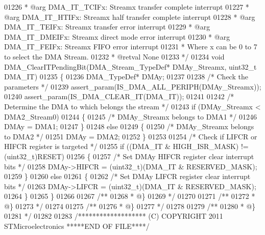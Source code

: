 \begin{DoxyCode}
01226 \textcolor{comment}{  *            @arg DMA\_IT\_TCIFx:  Streamx transfer complete interrupt}
01227 \textcolor{comment}{  *            @arg DMA\_IT\_HTIFx:  Streamx half transfer complete interrupt}
01228 \textcolor{comment}{  *            @arg DMA\_IT\_TEIFx:  Streamx transfer error interrupt}
01229 \textcolor{comment}{  *            @arg DMA\_IT\_DMEIFx: Streamx direct mode error interrupt}
01230 \textcolor{comment}{  *            @arg DMA\_IT\_FEIFx:  Streamx FIFO error interrupt}
01231 \textcolor{comment}{  *         Where x can be 0 to 7 to select the DMA Stream.}
01232 \textcolor{comment}{  * @retval None}
01233 \textcolor{comment}{  */}
01234 \textcolor{keywordtype}{void} DMA_ClearITPendingBit(DMA\_Stream\_TypeDef* DMAy\_Streamx, uint32\_t DMA\_IT)
01235 \{
01236   DMA\_TypeDef* DMAy;
01237 
01238   \textcolor{comment}{/* Check the parameters */}
01239   assert_param(IS\_DMA\_ALL\_PERIPH(DMAy\_Streamx));
01240   assert_param(IS\_DMA\_CLEAR\_IT(DMA\_IT));
01241 
01242   \textcolor{comment}{/* Determine the DMA to which belongs the stream */}
01243   \textcolor{keywordflow}{if} (DMAy\_Streamx < DMA2_Stream0)
01244   \{
01245     \textcolor{comment}{/* DMAy\_Streamx belongs to DMA1 */}
01246     DMAy = DMA1;
01247   \}
01248   \textcolor{keywordflow}{else}
01249   \{
01250     \textcolor{comment}{/* DMAy\_Streamx belongs to DMA2 */}
01251     DMAy = DMA2;
01252   \}
01253 
01254   \textcolor{comment}{/* Check if LIFCR or HIFCR register is targeted */}
01255   \textcolor{keywordflow}{if} ((DMA\_IT & HIGH_ISR_MASK) != (uint32\_t)RESET)
01256   \{
01257     \textcolor{comment}{/* Set DMAy HIFCR register clear interrupt bits */}
01258     DMAy->HIFCR = (uint32\_t)(DMA\_IT & RESERVED_MASK);
01259   \}
01260   \textcolor{keywordflow}{else}
01261   \{
01262     \textcolor{comment}{/* Set DMAy LIFCR register clear interrupt bits */}
01263     DMAy->LIFCR = (uint32\_t)(DMA\_IT & RESERVED_MASK);
01264   \}
01265 \}
01266 
01267 \textcolor{comment}{/**}
01268 \textcolor{comment}{  * @\}}
01269 \textcolor{comment}{  */}
01270 
01271 \textcolor{comment}{/**}
01272 \textcolor{comment}{  * @\}}
01273 \textcolor{comment}{  */}
01274 
01275 \textcolor{comment}{/**}
01276 \textcolor{comment}{  * @\}}
01277 \textcolor{comment}{  */}
01278 
01279 \textcolor{comment}{/**}
01280 \textcolor{comment}{  * @\}}
01281 \textcolor{comment}{  */}
01282 
01283 \textcolor{comment}{/******************* (C) COPYRIGHT 2011 STMicroelectronics *****END OF FILE****/}
\end{DoxyCode}
